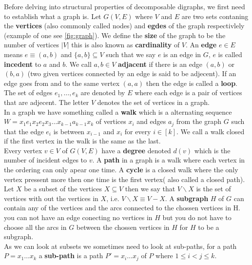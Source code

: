 Before delving into structural properties of decomposable digraphs, we first need to establish what a graph is.
Let $G(V,E)$ where $V$ and $E$ are two sets contaning the \textbf{vertices} (also commonly called nodes) and \textbf{egdes} of the graph respectivlely (example of one see \autoref{fig:graph}). 
We define the \textbf{size} of the graph to be the number of vertices $|V|$ this is also known as \textbf{cardinality} of $V$.
An \textbf{edge} $e \in E$ means $e \equiv (a, b)$ and $\{ a, b \} \subseteq V$ such that we say $e$ is an edge in $G$, $e$ is called \textbf{incedent} to $a$ and $b$. 
We call $a,b \in V$ \textbf{adjacent} if there is an edge $(a,b)$ or $(b,a)$ (two given vertices connected by an edge is said to be adjecent).
If an edge goes from and to the same vertex $(a,a)$ then the edge is called a \textbf{loop}.
The set of edges $e_1, \dots, e_k$ are denoted by $E$ where each edge is a pair of vertices that are adjecent. The letter $V$ denotes the set of vertices in a graph. \\
In a graph we have something called a \textbf{walk} which is a alternating sequence $W=x_1e_1x_2e_2x_3\dots x_{k-1}a_{k-1}x_k$ of vertices $x_i$ and edges $a_j$ from the graph $G$ such that the edge $e_i$ is between $x_{i-1}$ and $x_i$ for every $i\in [k]$. 
We call a walk closed if the first vertex in the walk is the same as the last.\\
Every vertex $v\in V$ of $G(V,E)$ have a \textbf{degree} denoted $d(v)$ which is the number of incident edges to $v$.
A \textbf{path} in a graph is a walk where each vertex in the ordering can only apear one time. 
A \textbf{cycle} is a closed walk where the only vertex pressent more then one time is the first vertex( also called a closed path). 
Let $X$ be a subset of the vertices $X\subseteq V$ then we say that $V\backslash X$ is the set of vertices with out the vertices in $X$, i.e. $V\backslash X \equiv V-X$. 
A \textbf{subgraph} $H$ of $G$ can contain any of the vertices and the arcs connected to the chossen vertices in H. 
you can not have an edge conecting no vertices in $H$ but you do not have to choose all the arcs in $G$ between the chossen vertices in $H$ for $H$ to be a subgraph. \\
As we can look at subsets we sometimes need to look at sub-paths, for a path $P=x_1\dots x_k$ a \textbf{sub-path} is a path $P'=x_i\dots x_j$ of $P$ where $1\leq i < j \leq k$.
